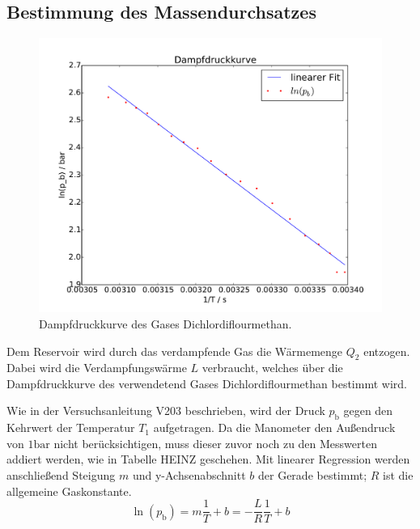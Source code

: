 \subsection{Bestimmung des Massendurchsatzes}
\begin{figure}
\includegraphics[width=\textwidth]{Bilder/Dampfdruckkurve.pdf}
	\caption{Dampfdruckkurve des Gases Dichlordiflourmethan.}
\end{figure}
Dem Reservoir wird durch das verdampfende Gas die Wärmemenge $Q_2$ entzogen. Dabei wird die Verdampfungswärme $L$ verbraucht, welches über die Dampfdruckkurve des verwendetend Gases Dichlordiflourmethan bestimmt wird. 

Wie in der Versuchsanleitung V203 beschrieben, wird der Druck $p_\mathup{b}$ gegen den Kehrwert der Temperatur $T_1$ aufgetragen. Da die Manometer den Außendruck von $1\si{\bar}$ nicht berücksichtigen, muss dieser zuvor noch zu den Messwerten addiert werden, wie in Tabelle HEINZ geschehen. Mit linearer Regression werden anschließend Steigung $m$ und y-Achsenabschnitt $b$ der Gerade bestimmt; $R$ ist die allgemeine Gaskonstante.
\begin{equation}
\ln{(p_\mathup{b})}=m \frac{1}{T}+b=-\frac{L}{R}\frac{1}{T}+b
\end{equation}

